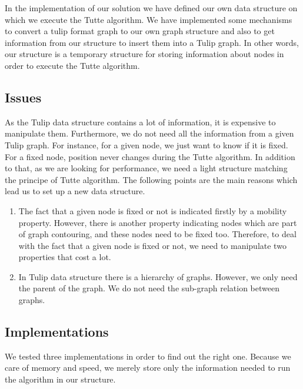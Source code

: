 In the implementation of our solution we have defined our own data
structure on which we execute the Tutte algorithm. We have
implemented some mechanisms to convert a tulip format graph to our own
graph structure and also to get information from our structure to insert them 
into a Tulip graph. In other words, our structure is a
temporary structure for storing information about nodes in order to
execute the Tutte algorithm.

\subsection{Issues}
As the Tulip data structure contains a lot of information, it is
expensive to manipulate them. Furthermore, we do not need all the
information from a given Tulip graph. For
instance, for a given node, we just want to know if it is fixed. For a
fixed node, position never changes during the Tutte algorithm. In
addition to that, as we are looking for performance, we need a light
structure matching the principe of Tutte algorithm. The following
points are the main reasons which lead us to set up a new data
structure.
\begin{enumerate}
\item The fact that a given node is fixed or not is indicated firstly
  by a mobility property. However, there is another property indicating
  nodes which are part of graph contouring, and these nodes need to be
  fixed too. Therefore, to deal with the fact that a given node is fixed or
  not, we need to manipulate two properties that cost a lot.

\item In Tulip data structure there is a hierarchy of graphs. However, we only need
  the parent of the graph. We do not need the sub-graph relation between graphs.


\end{enumerate}  

\subsection{Implementations}
We tested three implementations in order to find out the right one. Because we care of memory and speed, we merely store only the information needed to run the algorithm in our structure.

